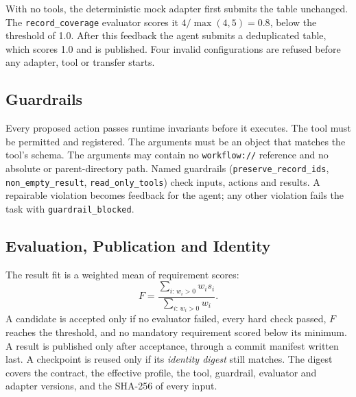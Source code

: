 

With no tools, the deterministic mock adapter first submits the table
unchanged. The \texttt{record\_coverage} evaluator scores it $4/\max(4,5) =
0.8$, below the threshold of 1.0. After this feedback the agent submits a
deduplicated table, which scores 1.0 and is published. Four invalid
configurations are refused before any adapter, tool or transfer starts.

\subsection{Guardrails}

Every proposed action passes runtime invariants before it executes. The tool
must be permitted and registered. The arguments must be an object that
matches the tool's schema. The arguments may contain no \texttt{workflow://}
reference and no absolute or parent-directory path. Named guardrails
(\texttt{preserve\_record\_ids}, \texttt{non\_empty\_result},
\texttt{read\_only\_tools}) check inputs, actions and results. A repairable
violation becomes feedback for the agent; any other violation fails the task
with \texttt{guardrail\_blocked}.



\subsection{Evaluation, Publication and Identity}

The result fit is a weighted mean of requirement scores:
\[
F = \frac{\sum_{i:\,w_i>0} w_i s_i}{\sum_{i:\,w_i>0} w_i}.
\]
A candidate is accepted only if no evaluator failed, every hard check passed,
$F$ reaches the threshold, and no mandatory requirement scored below its
minimum. A result is published only after acceptance, through a commit
manifest written last. A checkpoint is reused only if its \emph{identity
digest} still matches. The digest covers the contract, the effective
profile, the tool, guardrail, evaluator and adapter versions, and the SHA-256
of every input.



